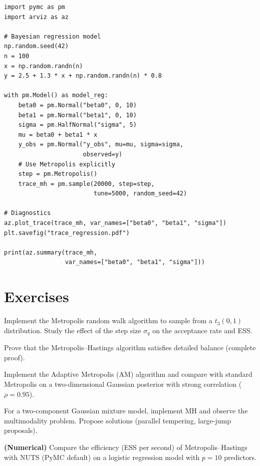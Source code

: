 \begin{codeblock}[title=\textbf{Multidimensional MH with PyMC}]
\begin{verbatim}
import pymc as pm
import arviz as az

# Bayesian regression model
np.random.seed(42)
n = 100
x = np.random.randn(n)
y = 2.5 + 1.3 * x + np.random.randn(n) * 0.8

with pm.Model() as model_reg:
    beta0 = pm.Normal("beta0", 0, 10)
    beta1 = pm.Normal("beta1", 0, 10)
    sigma = pm.HalfNormal("sigma", 5)
    mu = beta0 + beta1 * x
    y_obs = pm.Normal("y_obs", mu=mu, sigma=sigma,
                      observed=y)
    # Use Metropolis explicitly
    step = pm.Metropolis()
    trace_mh = pm.sample(20000, step=step,
                         tune=5000, random_seed=42)

# Diagnostics
az.plot_trace(trace_mh, var_names=["beta0", "beta1", "sigma"])
plt.savefig("trace_regression.pdf")

print(az.summary(trace_mh,
                 var_names=["beta0", "beta1", "sigma"]))
\end{verbatim}
\end{codeblock}

\section{Exercises}

\begin{exercise}
Implement the Metropolis random walk algorithm to sample from a
$t_3(0, 1)$ distribution. Study the effect of the step size $\sigma_q$
on the acceptance rate and ESS.
\end{exercise}

\begin{exercise}
Prove that the Metropolis--Hastings algorithm satisfies detailed
balance (complete proof).
\end{exercise}

\begin{exercise}
Implement the Adaptive Metropolis (AM) algorithm and compare with
standard Metropolis on a two-dimensional Gaussian posterior with strong
correlation ($\rho = 0.95$).
\end{exercise}

\begin{exercise}
For a two-component Gaussian mixture model, implement MH and observe
the multimodality problem. Propose solutions (parallel tempering,
large-jump proposals).
\end{exercise}

\begin{exercise}
\textbf{(Numerical)} Compare the efficiency (ESS per second) of
Metropolis--Hastings with NUTS (PyMC default) on a logistic regression
model with $p = 10$ predictors.
\end{exercise}
